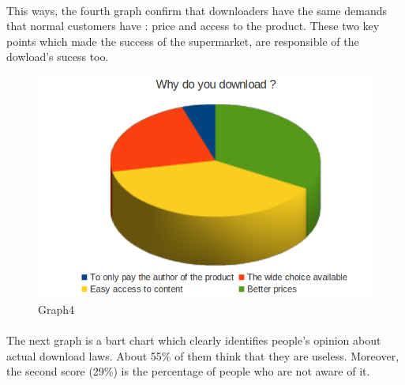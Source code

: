 \documentclass[a4paper]{article}
\begin{document}
\paragraph{}
This ways, the fourth graph confirm that downloaders have the same demands that normal customers have  : price and access to the product. These two key points which made the success of the supermarket, are responsible of the dowload's sucess too.
\begin{figure}[htbp]
  \centering
  \includegraphics[scale=0.40]{graph4}
  \caption{Graph4}
  \label{fig:Graph4}
\end{figure}
\paragraph{}
The next graph is a bart chart which clearly identifies people's opinion about actual download laws. About 55\% of them think that they are useless. Moreover, the second score (29\%) is the percentage of people who are not aware of it. 
\end{document}
